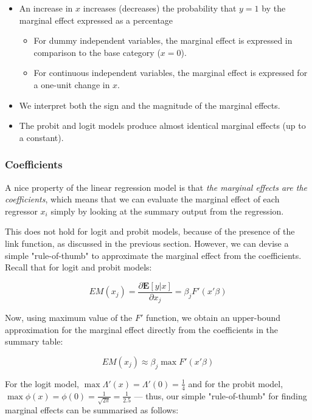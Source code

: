 \begin{itemize}
    \item An increase in $x$ increases (decreases) the probability that $y=1$ by the marginal effect
expressed as a percentage
    \begin{itemize}
        \item For dummy independent variables, the marginal effect is expressed in comparison to the
    base category ($x=0$).
        \item For continuous independent variables, the marginal effect is expressed for a one-unit
    change in $x$.
    \end{itemize}
    \item We interpret both the sign and the magnitude of the marginal effects.
    \item The probit and logit models produce almost identical marginal effects (up to a constant).
\end{itemize}

\subsubsection{Coefficients}
A nice property of the linear regression model is that \textit{the marginal effects are the coefficients}, which means that we can evaluate the marginal effect of each regressor $x_i$ simply by looking at the summary output from the regression.

This does not hold for logit and probit models, because of the presence of the link function, as discussed in the previous section. However, we can devise a simple "rule-of-thumb" to approximate the marginal effect from the coefficients. Recall that for logit and probit models:

\begin{equation}
    EM(x_j) = \frac{\partial \mathbf{E}[y|x]}{\partial x_j} = \beta_j F'(x'\beta)
\end{equation}

Now, using maximum value of the $F'$ function, we obtain an upper-bound approximation for the marginal effect directly from the coefficients in the summary table:

\begin{equation}
    EM(x_j) \approx \beta_j \max F'(x'\beta)
\end{equation}

For the logit model, $\max \Lambda'(x) = \Lambda'(0) = \frac{1}{4}$ and for the probit model, $\max \phi(x) = \phi(0) = \frac{1}{\sqrt{2\pi}} = \frac{1}{2.5}$ --- thus, our simple "rule-of-thumb" for finding marginal effects can be summarised as follows:

